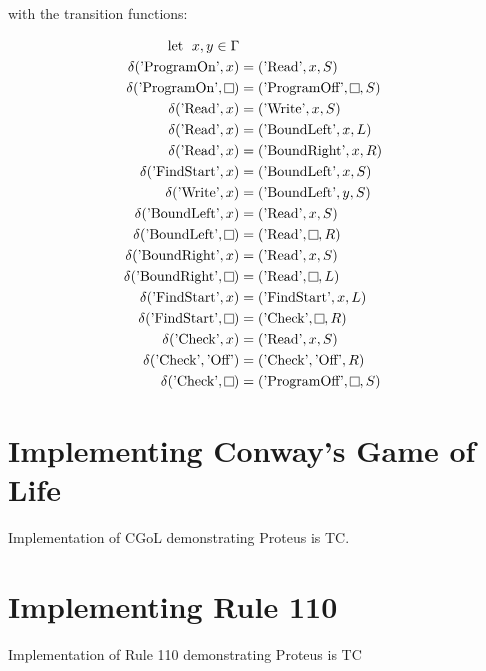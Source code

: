 with the transition functions:

\[
    \begin{aligned}
        \text{let \hspace{0.1cm}} x, y \in \Gamma\\
        \delta (\text{'ProgramOn'}, x) &= (\text{'Read'}, x, S)\\
        \delta (\text{'ProgramOn'}, \raisebox{0.1cm}{\fbox{}}) &= (\text{'ProgramOff'}, \raisebox{0.1cm}{\fbox{}}, S)\\
%
        \delta (\text{'Read'}, x) &= (\text{'Write'}, x, S)\\
        \delta (\text{'Read'}, x) &= (\text{'BoundLeft'}, x, L)\\
        \delta (\text{'Read'}, x) &= (\text{'BoundRight'}, x, R)\\
        \delta (\text{'FindStart'}, x) &= (\text{'BoundLeft'}, x, S)\\
%
        \delta (\text{'Write'}, x) &= (\text{'BoundLeft'}, y, S)\\
%
        \delta (\text{'BoundLeft'}, x) &= (\text{'Read'}, x, S)\\
        \delta (\text{'BoundLeft'}, \raisebox{0.1cm}{\fbox{}}) &= (\text{'Read'}, \raisebox{0.1cm}{\fbox{}}, R)\\
%
        \delta (\text{'BoundRight'}, x) &= (\text{'Read'}, x, S)\\
        \delta (\text{'BoundRight'}, \raisebox{0.1cm}{\fbox{}}) &= (\text{'Read'}, \raisebox{0.1cm}{\fbox{}}, L)\\
%
        \delta (\text{'FindStart'}, x) &= (\text{'FindStart'}, x, L)\\
        \delta (\text{'FindStart'}, \raisebox{0.1cm}{\fbox{}}) &= (\text{'Check'}, \raisebox{0.1cm}{\fbox{}}, R)\\
%
        \delta (\text{'Check'}, x) &= (\text{'Read'}, x, S)\\
        \delta (\text{'Check'}, \text{'Off'}) &= (\text{'Check'}, \text{'Off'}, R)\\
        \delta (\text{'Check'}, \raisebox{0.1cm}{\fbox{}}) &= (\text{'ProgramOff'}, \raisebox{0.1cm}{\fbox{}}, S)\\
    \end{aligned}
\]

\section{Implementing Conway's Game of Life}\label{sec:ImplementCGoL}

Implementation of CGoL demonstrating Proteus is TC.

\section{Implementing Rule 110}\label{sec:ImplementRule110}

Implementation of Rule 110 demonstrating Proteus is TC

